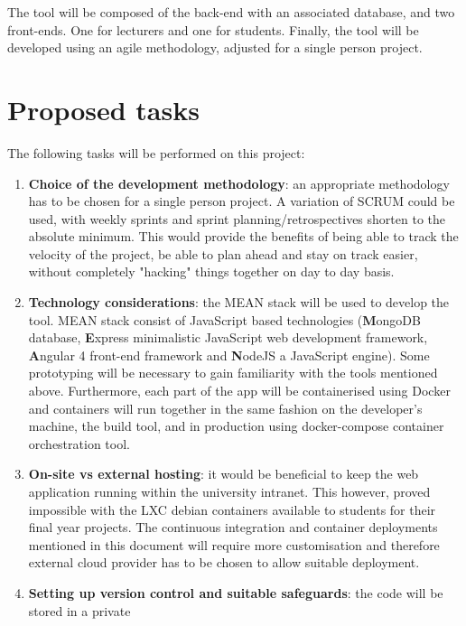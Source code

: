 \documentclass[11pt,fleqn,twoside]{article}
\begin{document}
The tool will be composed of the back-end with an associated database, and two
front-ends. One for lecturers and one for students. Finally, the tool will be
developed using an agile methodology, adjusted for a single person project.

\section{Proposed tasks}
The following tasks will be performed on this project:

\begin{enumerate}
  \item \textbf{Choice of the development methodology}: an appropriate methodology has to be
    chosen for a single person project. A variation of SCRUM could be used, with weekly sprints
    and sprint planning/retrospectives shorten to the absolute minimum. This would provide the
    benefits of being able to track the velocity of the project, be able to plan ahead and stay on
    track easier, without completely "hacking" things together on day to day basis.
  \item \textbf{Technology considerations}: the MEAN stack\cite{2} will be used to develop the tool. MEAN
    stack consist of JavaScript based technologies (\textbf{M}ongoDB database, \textbf{E}xpress minimalistic JavaScript web
    development framework, \textbf{A}ngular 4 front-end framework and \textbf{N}odeJS a JavaScript engine).
    Some prototyping will be necessary to gain familiarity with the tools mentioned above. Furthermore,
    each part of the app will be containerised using Docker\cite{3} and containers will run together in the same fashion
    on the developer's machine, the build tool, and in production using docker-compose\cite{4} container orchestration tool.
  \item \textbf{On-site vs external hosting}: it would be beneficial to keep the web application running
    within the university intranet. This however, proved impossible with the LXC debian containers\cite{5} available
    to students for their final year projects. The continuous integration and container deployments mentioned
    in this document will require more customisation and therefore external cloud provider has to be
    chosen to allow suitable deployment.
  \item \textbf{Setting up version control and suitable safeguards}: the code will be stored in a private

\end{enumerate}
\end{document}
